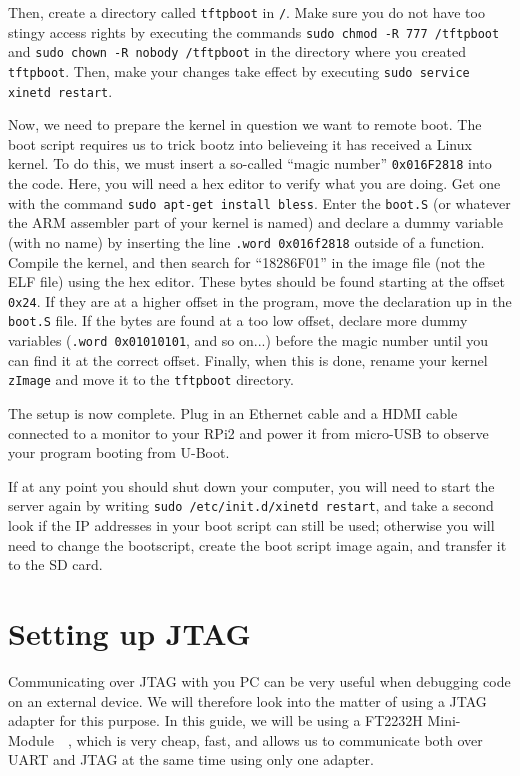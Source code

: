 \documentclass[a4paper,11pt,reqno]{amsart}
\begin{document}
{Then, create a directory called \texttt{tftpboot} in \texttt{/}. Make sure you do not have too stingy access rights by executing the commands \texttt{sudo chmod -R 777 /tftpboot} and \texttt{sudo chown -R nobody /tftpboot} in the directory where you created \texttt{tftpboot}. Then, make your changes take effect by executing \texttt{sudo service xinetd restart}.

Now, we need to prepare the kernel in question we want to remote boot. The boot script requires us to trick bootz into believeing it has received a Linux kernel. To do this, we must insert a so-called ``magic number'' \texttt{0x016F2818} into the code. Here, you will need a hex editor to verify what you are doing. Get one with the command \texttt{sudo apt-get install bless}. Enter the \texttt{boot.S} (or whatever the ARM assembler part of your kernel is named) and declare a dummy variable (with no name) by inserting the line \texttt{.word 0x016f2818} outside of a function. Compile the kernel, and then search for ``18286F01'' in the image file (not the ELF file) using the hex editor. These bytes should be found starting at the offset \texttt{0x24}. If they are at a higher offset in the program, move the declaration up in the \texttt{boot.S} file. If the bytes are found at a too low offset, declare more dummy variables (\texttt{.word 0x01010101}, and so on...) before the magic number until you can find it at the correct offset. Finally, when this is done, rename your kernel \texttt{zImage} and move it to the \texttt{tftpboot} directory.

The setup is now complete. Plug in an Ethernet cable and a HDMI cable connected to a monitor to your RPi2 and power it from micro-USB to observe your program booting from U-Boot.

If at any point you should shut down your computer, you will need to start the server again by writing \texttt{sudo /etc/init.d/xinetd restart}, and take a second look if the IP addresses in your boot script can still be used; otherwise you will need to change the bootscript, create the boot script image again, and transfer it to the SD card.

\section{Setting up JTAG}
Communicating over JTAG with you PC can be very useful when debugging code on an external device. We will therefore look into the matter of using a JTAG adapter for this purpose. In this guide, we will be using a FT2232H Mini-Module~\cite{ft2232h}~\cite{ft2232hmm}, which is very cheap, fast, and allows us to communicate both over UART and JTAG at the same time using only one adapter.

}
\end{document}
